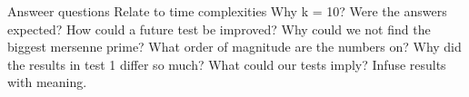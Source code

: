 \documentclass[main.tex]{subfiles}
\begin{document}
Answeer questions
Relate to time complexities
Why k = 10?
Were the answers expected?
How could a future test be improved?
Why could we not find the biggest mersenne prime?
What order of magnitude are the numbers on?
Why did the results in test 1 differ so much?
What could our tests imply?
Infuse results with meaning.
\end{document}
